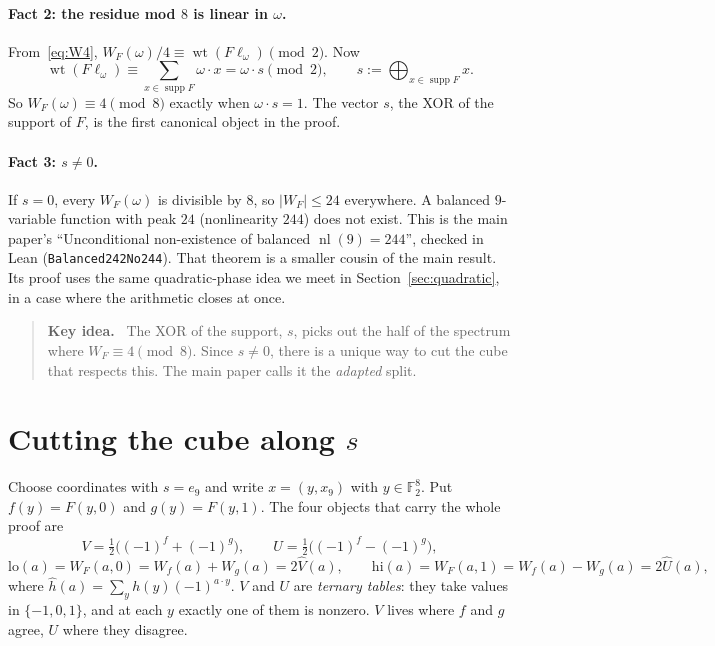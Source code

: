 \documentclass[11pt]{article}
\theoremstyle{definition}
\theoremstyle{remark}
\newcommand{\F}{\mathbb{F}}
\newcommand{\wt}{\operatorname{wt}}
\newcommand{\nl}{\operatorname{nl}}
\newcommand{\supp}{\operatorname{supp}}
\newcommand{\lo}{\mathrm{lo}}
\newcommand{\hi}{\mathrm{hi}}
\newcommand{\code}[1]{\texttt{#1}}
\DeclareRobustCommand{\_}{\textunderscore\allowbreak}
\newenvironment{keyidea}{\begin{quote}\small\textbf{Key idea.}\ }{\end{quote}}
\begin{document}
\paragraph{Fact 2: the residue mod $8$ is linear in $\omega$.} From~\eqref{eq:W4}, $W_F(\omega)/4\equiv\wt(F\ell_\omega)\pmod 2$. Now
\[
  \wt(F\ell_\omega)\equiv\sum_{x\in\supp F}\omega\cdot x=\omega\cdot s\pmod 2,
  \qquad s:=\bigoplus_{x\in\supp F}x .
\]
So $W_F(\omega)\equiv4\pmod 8$ exactly when $\omega\cdot s=1$. The vector $s$, the XOR of the support of $F$, is the first canonical object in the proof.

\paragraph{Fact 3: $s\neq0$.} If $s=0$, every $W_F(\omega)$ is divisible by $8$, so $|W_F|\le 24$ everywhere. A balanced $9$-variable function with peak $24$ (nonlinearity $244$) does not exist. This is the main paper's ``Unconditional non-existence of balanced $\nl(9)=244$'', checked in Lean (\code{Balanced242No244}). That theorem is a smaller cousin of the main result. Its proof uses the same quadratic-phase idea we meet in Section~\ref{sec:quadratic}, in a case where the arithmetic closes at once.

\begin{keyidea}
The XOR of the support, $s$, picks out the half of the spectrum where $W_F\equiv4\pmod 8$. Since $s\neq0$, there is a unique way to cut the cube that respects this. The main paper calls it the \emph{adapted} split.
\end{keyidea}

\section{Cutting the cube along \texorpdfstring{$s$}{s}}
\label{sec:split}

Choose coordinates with $s=e_9$ and write $x=(y,x_9)$ with $y\in\F_2^8$. Put $f(y)=F(y,0)$ and $g(y)=F(y,1)$. The four objects that carry the whole proof are
\[
  V=\tfrac12\bigl((-1)^f+(-1)^g\bigr),\qquad U=\tfrac12\bigl((-1)^f-(-1)^g\bigr),
\]
\[
  \lo(a)=W_F(a,0)=W_f(a)+W_g(a)=2\widehat V(a),\qquad \hi(a)=W_F(a,1)=W_f(a)-W_g(a)=2\widehat U(a),
\]
where $\widehat h(a)=\sum_y h(y)(-1)^{a\cdot y}$. $V$ and $U$ are \emph{ternary tables}: they take values in $\{-1,0,1\}$, and at each $y$ exactly one of them is nonzero. $V$ lives where $f$ and $g$ agree, $U$ where they disagree.
\end{document}
